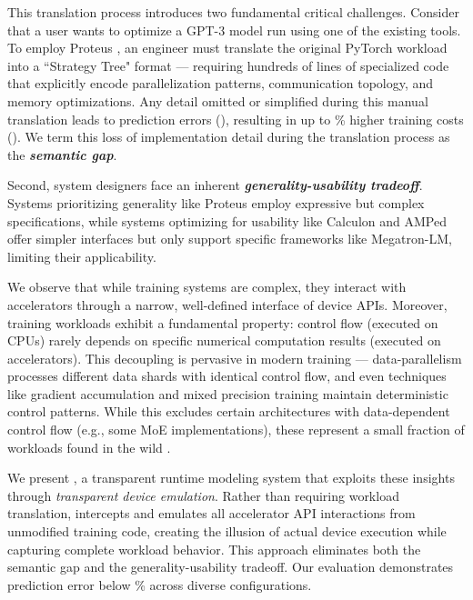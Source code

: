 This translation process introduces two fundamental critical challenges. Consider that a user wants to optimize a GPT-3 model run using one of the existing tools. To employ Proteus \cite{duan2023proteus}, an engineer must translate the original PyTorch workload into a ``Strategy Tree" format --- requiring hundreds of lines of specialized code \cite{proteusgithub} that explicitly encode parallelization patterns, communication topology, and memory optimizations. Any detail omitted or simplified during this manual translation leads to prediction errors (), resulting in up to \evaltc\% higher training costs (). We term this loss of implementation detail during the translation process as the \textbf{\textit{semantic gap}}.

Second, system designers face an inherent \textbf{\textit{generality-usability tradeoff}}. Systems prioritizing generality like Proteus employ expressive but complex specifications, while systems optimizing for usability like Calculon \cite{isaev2023calculon} and AMPed \cite{moolchandani2023amped} offer simpler interfaces but only support specific frameworks like Megatron-LM, limiting their applicability.

We observe that while training systems are complex, they interact with accelerators through a narrow, well-defined interface of device APIs. Moreover, training workloads exhibit a fundamental property: control flow (executed on CPUs) rarely depends on specific numerical computation results (executed on accelerators). This decoupling is pervasive in modern training --- data-parallelism processes different data shards with identical control flow, and even techniques like gradient accumulation and mixed precision training maintain deterministic control patterns. While this excludes certain architectures with data-dependent control flow (e.g., some MoE implementations), these represent a small fraction of workloads found in the wild \cite{zhu2020daydream,geoffrey2021habitat,duan2023proteus,isaev2023calculon,lu2023distsim,flexflow,unger2022unity}.

We present \sysname, a transparent runtime modeling system that exploits these insights through \textit{transparent device emulation}. Rather than requiring workload translation, \sysname intercepts and emulates all accelerator API interactions from unmodified training code, creating the illusion of actual device execution while capturing complete workload behavior. This approach eliminates both the semantic gap and the generality-usability tradeoff. Our evaluation demonstrates prediction error below \evalpe{}\% across diverse configurations.

